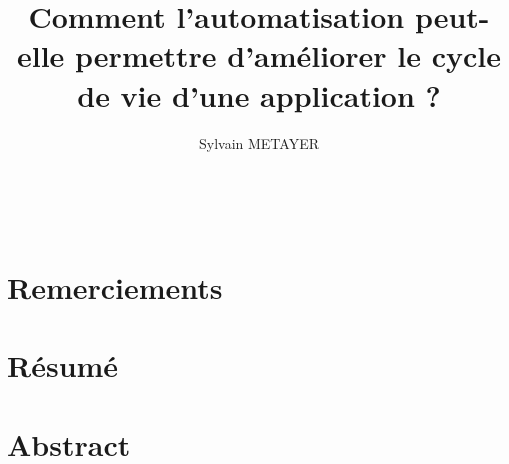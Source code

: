 \documentclass[11pt,a4paper]{article}
\title{Comment l'automatisation peut-elle permettre d'améliorer le cycle de vie d'une application ?}
\author{Sylvain METAYER}
\begin{document}
	\pagestyle{plain} %
	 
\newpage
	~ %
\newpage
	\iftoggle{todoExplain}{%
		\section*{Détails des couleurs todo}
		\begin{itemize}
			\item \emph{gray} est utilisé pour les parties obligatoires, mais non relative au contenu pur du mémoire (remerciements, abstract...)
			\item \emph{red} est utilisé pour les todos nécessitant de la recherche et de la rédaction.
			\item \emph{orange} est utilisé pour les parties nécessitant des refonte, soit sur la forme, soit parce qu'elle doivent être liées à d'autres parties.
			\item \emph{cyan} est utilisé pour les parties nécessitant de la rédaction sans recherche.
			\item \emph{yellow} est utilisé pour des estimations de nombre de page que la partie est \emph{censée} occuper.
		\end{itemize}
	}{}
	\listoftodos 
\newpage
	\section*{Remerciements}
	
\newpage
	\renewcommand{\contentsname}{Sommaire}
	\tableofcontents
\newpage
\newpage
	\pagenumbering{\numerotationType} %
	
\newpage
	\section*{Résumé}
	
\newpage
	\section*{Abstract}
	
\newpage
\end{document}
